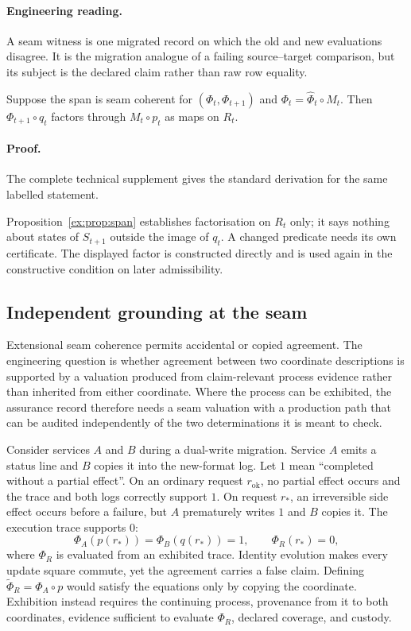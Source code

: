 \documentclass[twocolumn,envcountsect,envcountsame,natbib]{svjour3}
\begin{document}
\paragraph{Engineering reading.} A seam witness is one migrated record on which the old and new evaluations disagree. It is the migration analogue of a failing source--target comparison, but its subject is the declared claim rather than raw row equality.

\begin{proposition}\label{ex:prop:span}
Suppose the span is seam coherent for $(\Phi_t,\Phi_{t+1})$ and $\Phi_t=\widehat\Phi_t \circ M_t$. Then $\Phi_{t+1} \circ q_t$ factors through $M_t \circ p_t$ as maps on $R_t$.
\end{proposition}

\paragraph{Proof.} The complete technical supplement gives the standard derivation for the same labelled statement.

Proposition~\ref{ex:prop:span} establishes factorisation on $R_t$ only; it says nothing about states of $S_{t+1}$ outside the image of $q_t$. A changed predicate needs its own certificate. The displayed factor is constructed directly and is used again in the constructive condition on later admissibility.

\subsection{Independent grounding at the seam}\label{ex:sec:grounding-seam}

Extensional seam coherence permits accidental or copied agreement. The engineering question is whether agreement between two coordinate descriptions is supported by a valuation produced from claim-relevant process evidence rather than inherited from either coordinate. Where the process can be exhibited, the assurance record therefore needs a seam valuation with a production path that can be audited independently of the two determinations it is meant to check.

Consider services $A$ and $B$ during a dual-write migration. Service $A$ emits a status line and $B$ copies it into the new-format log. Let $1$ mean ``completed without a partial effect''. On an ordinary request $r_{\mathrm{ok}}$, no partial effect occurs and the trace and both logs correctly support $1$. On request $r_*$, an irreversible side effect occurs before a failure, but $A$ prematurely writes $1$ and $B$ copies it. The execution trace supports $0$:
\[
\Phi_A(p(r_*))
=\Phi_B(q(r_*))=1,
\qquad
\Phi_R(r_*)=0,
\]
where $\Phi_R$ is evaluated from an exhibited trace. Identity evolution makes every update square commute, yet the agreement carries a false claim. Defining $\widetilde\Phi_R=\Phi_A\circ p$ would satisfy the equations only by copying the coordinate. Exhibition instead requires the continuing process, provenance from it to both coordinates, evidence sufficient to evaluate $\Phi_R$, declared coverage, and custody.
\end{document}
